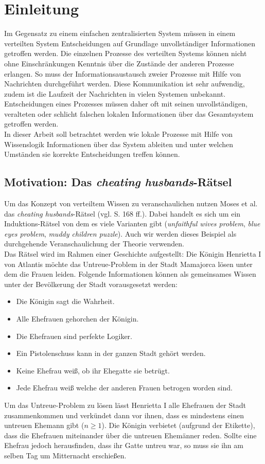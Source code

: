 \section{Einleitung}
Im Gegensatz zu einem einfachen zentralisierten System müssen in einem verteilten System Entscheidungen auf Grundlage unvollständiger Informationen getroffen werden.
Die einzelnen Prozesse des verteilten Systems können nicht ohne Einschränkungen Kenntnis über die Zustände der anderen Prozesse erlangen.
So muss der Informationsaustausch zweier Prozesse mit Hilfe von Nachrichten durchgeführt werden. Diese Kommunikation ist sehr aufwendig, zudem ist die Laufzeit der Nachrichten in vielen Systemen unbekannt.
Entscheidungen eines Prozesses müssen daher oft mit seinen unvollständigen, veralteten oder schlicht falschen lokalen Informationen über das Gesamtsystem getroffen werden.\\
In dieser Arbeit soll betrachtet werden wie lokale Prozesse mit Hilfe von Wissenslogik Informationen über das System ableiten und unter welchen Umständen sie korrekte Entscheidungen treffen können.

\subsection{Motivation: Das \textit{cheating husbands}-Rätsel}
\label{motivation}
Um das Konzept von verteiltem Wissen zu veranschaulichen nutzen Moses et al. \cite{moses1986cheating} das \textit{cheating husbands}-Rätsel (vgl. \cite{moses1986cheating} S. 168 ff.).
Dabei handelt es sich um ein Induktions-Rätsel von dem es viele Varianten gibt (\textit{unfaithful wives problem}, \textit{blue eyes problem}, \textit{muddy children puzzle}). Auch wir werden dieses Beispiel als durchgehende Veranschaulichung der Theorie verwenden.\\
Das Rätsel wird im Rahmen einer Geschichte aufgestellt: Die Königin Henrietta I von Atlantis möchte das Untreue-Problem in der Stadt Mamajorca lösen unter dem die Frauen leiden.
Folgende Informationen können als gemeinsames Wissen unter der Bevölkerung der Stadt vorausgesetzt werden:
\begin{itemize}
	\item Die Königin sagt die Wahrheit.
	\item Alle Ehefrauen gehorchen der Königin.
	\item Die Ehefrauen sind perfekte Logiker.
	\item Ein Pistolenschuss kann in der ganzen Stadt gehört werden.
	\item Keine Ehefrau weiß, ob ihr Ehegatte sie betrügt.
	\item Jede Ehefrau weiß welche der anderen Frauen betrogen worden sind.
\end{itemize}
Um das Untreue-Problem zu lösen lässt Henrietta I alle Ehefrauen der Stadt zusammenkommen und verkündet dann vor ihnen, dass es mindestens einen untreuen Ehemann gibt ($n \ge 1$).
Die Königin verbietet (aufgrund der Etikette), dass die Ehefrauen miteinander über die untreuen Ehemänner reden.
Sollte eine Ehefrau jedoch herausfinden, dass ihr Gatte untreu war, so muss sie ihn am selben Tag um Mitternacht erschießen.\medskip

